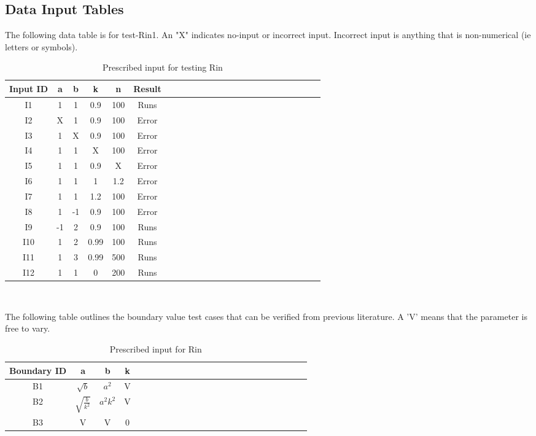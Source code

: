 \documentclass[12pt, titlepage]{article}
\begin{document}
\newpage
\subsection{Data Input Tables} 

The following data table is for test-Rin1. An "X" indicates no-input or 
incorrect input. Incorrect input is anything that is non-numerical (ie letters 
or symbols). 

\begin{table}[h!]
	\centering
	\begin{tabular}{|c|c|c|c|c|c|c|c|c|c|c|c|c|c|c|c|c|c|c|c|c|c|c|c|}
		\hline        
		Input ID& a& b & k & n& Result \\
		\hline
		I1     &1 &1 &0.9 &100 & Runs \\ \hline
		I2    &X &1 &0.9 &100 & Error \\ \hline
		I3    &1 &X &0.9 &100 & Error\\ \hline 
		I4    &1 &1 &X &100 &Error \\ \hline 
		I5     &1 &1 &0.9 &X &Error \\ \hline
		I6    &1 &1 &1 & 1.2& Error\\ \hline
		I7    &1 &1 &1.2 & 100&Error\\ \hline 
		I8    &1 &-1 &0.9 &100& Error \\ \hline
		I9     &-1 &2 &0.9 &100 & Runs \\ \hline
		I10    &1 &2 &0.99 &100 & Runs\\ \hline
		I11    &1 &3 &0.99 &500 & Runs \\ \hline 
		I12   &1 &1 &0 &200 &Runs  \\ 
		\hline
	\end{tabular}\\
	\caption{Prescribed input for testing Rin}
	\label{Table:D_1}
\end{table} 

The following table outlines the boundary value test cases that can be verified 
from previous literature. A 'V' means that the parameter is free to vary.
\begin{table}[h!]
	\centering
	\begin{tabular}{|c|c|c|c|c|c|c|c|c|c|c|c|c|c|c|c|c|c|c|c|c|c|c|c|}
		\hline        
		Boundary ID& a& b& k  \\
		\hline
		B1     &$\sqrt{b}$ &$a^{2}$ &V    \\ \hline
		B2    &$\sqrt{\frac{b}{k^{2}}}$ &$a^{2}k^{2}$ &V   \\ \hline
		B3    &V &V &0  \\ 
		\hline
	\end{tabular}\\
	\caption{Prescribed input for Rin}
	\label{Table:D_2}
\end{table} 
\end{document}
